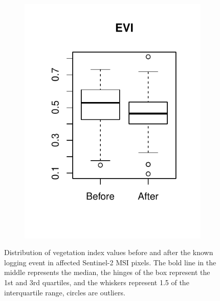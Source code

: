 \documentclass[a4paper,12pt]{scrbook}
\begin{document}
\begin{figure}
\begin{subfigure}[b]{0.32\textwidth}
    \includegraphics[width=\textwidth]{thesis-figures/07-boxplot-evi}
  \end{subfigure}
  \caption{Distribution of vegetation index values before and after the known logging event in affected Sentinel-2 \ac{MSI} pixels. The bold line in the middle represents the median, the hinges of the box represent the 1st and 3rd quartiles, and the whiskers represent 1.5 of the interquartile range, circles are outliers.}
  \label{fig-boxplots}
\end{figure}
\end{document}
